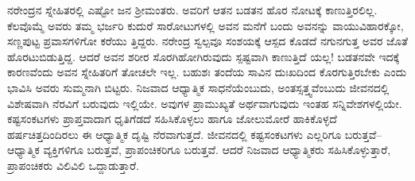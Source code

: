 ನರೇಂದ್ರನ ಸ್ನೇಹಿತರಲ್ಲಿ ಎಷ್ಟೋ ಜನ ಶ್ರೀಮಂತರು. ಅವರಿಗೆ ಆತನ ಬಡತನ ಹೊರ ನೋಟಕ್ಕೆ ಕಾಣುತ್ತಿರಲಿಲ್ಲ. ಕೆಲವೊಮ್ಮೆ ಅವರು ತಮ್ಮ ಭರ್ಜರಿ ಕುದುರೆ ಸಾರೋಟುಗಳಲ್ಲಿ ಅವನ ಮನೆಗೆ ಬಂದು ಅವನನ್ನು ವಾಯುವಿಹಾರಕ್ಕೋ, ಸಣ್ಣಪುಟ್ಟ ಪ್ರವಾಸಗಳಿಗೋ ಕರೆಯು ತ್ತಿದ್ದರು. ನರೇಂದ್ರ ಸ್ವಲ್ಪವೂ ಸಂಶಯಕ್ಕೆ ಆಸ್ಪದ ಕೊಡದೆ ನಗುನಗುತ್ತ ಅವರ ಜೊತೆ ಹೊರಟುಬಿಡುತ್ತಿದ್ದ. ಆದರೆ ಅವನ ಶರೀರ ಸೊರಗಿಹೋಗಿರುವುದು ಸ್ಪಷ್ಟವಾಗಿ ಕಾಣುತ್ತಿದೆ ಯಲ್ಲ! ಬಡತನವೇ ಇದಕ್ಕೆ ಕಾರಣವೆಂದು ಅವನ ಸ್ನೇಹಿತರಿಗೆ ತೋಚಲೇ ಇಲ್ಲ. ಬಹುಶಃ ತಂದೆಯ ಸಾವಿನ ದುಃಖದಿಂದ ಕೊರಗುತ್ತಿರಬೇಕು ಎಂದು ಭಾವಿಸಿ ಅವರು ಸುಮ್ಮನಾಗಿ ಬಿಟ್ಟರು. ನಿಜವಾದ ಆಧ್ಯಾತ್ಮಿಕ ಸಾಧನೆಯೆಂಬುದು, ಅಂತಸ್ಸತ್ತ್ವವೆಂಬುದು ಜೀವನದಲ್ಲಿ ವಿಶೇಷವಾಗಿ ನೆರವಿಗೆ ಬರುವುದು ಇಲ್ಲಿಯೇ. ಅವುಗಳ ಪ್ರಾಮುಖ್ಯತೆ ಅರ್ಥವಾಗುವುದು ಇಂತಹ ಸನ್ನಿವೇಶಗಳಲ್ಲಿಯೇ. ಕಷ್ಟಸಂಕಟಗಳು ಪ್ರಾಪ್ತವಾದಾಗ ಧೃತಿಗೆಡದೆ ಸಹಿಸಿಕೊಳ್ಳಲು ಹಾಗೂ ಜೋಲುಮೋರೆ ಹಾಕಿಕೊಳ್ಳದೆ ಹರ್ಷಚಿತ್ತದಿಂದಿರಲು ಈ ಆಧ್ಯಾತ್ಮಿಕ ದೃಷ್ಟಿ ನೆರವಾಗುತ್ತದೆ. ಜೀವನದಲ್ಲಿ ಕಷ್ಟಸಂಕಟಗಳು ಎಲ್ಲರಿಗೂ ಬರುತ್ತವೆ–ಆಧ್ಯಾತ್ಮಿಕ ವ್ಯಕ್ತಿಗಳಿಗೂ ಬರುತ್ತವೆ, ಪ್ರಾಪಂಚಿಕರಿಗೂ ಬರುತ್ತವೆ. ಆದರೆ ನಿಜವಾದ ಆಧ್ಯಾತ್ಮಿಕರು ಸಹಿಸಿಕೊಳ್ಳುತ್ತಾರೆ, ಪ್ರಾಪಂಚಿಕರು ವಿಲಿವಿಲಿ ಒದ್ದಾಡುತ್ತಾರೆ.

